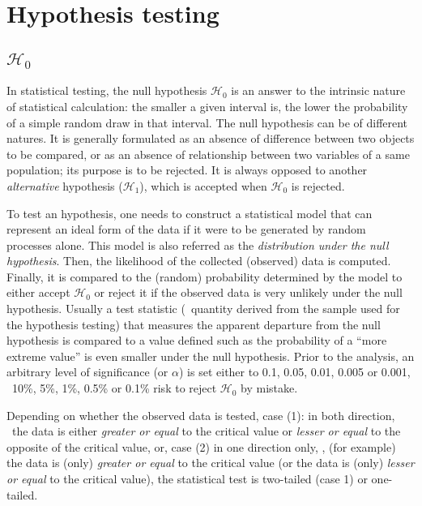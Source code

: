 \section{Hypothesis testing}\label{pq-values}

\subsection{$\mathcal{H}_0$}\label{H0}
In statistical testing,
the null hypothesis $\mathcal{H}_0$ is an answer
to the intrinsic nature of statistical calculation:
the smaller a given interval is,
the lower the probability of a simple random draw in that interval.
The null hypothesis can be of different natures.
It is generally formulated as an absence of difference
between two objects to be compared,
or as an absence of relationship between two variables of a same population;
its purpose is to be rejected.
It is always opposed to another \emph{alternative} hypothesis ($\mathcal{H}_1$),
which is accepted when $\mathcal{H}_0$ is rejected.

To test an hypothesis,
one needs to construct a statistical model that can represent an ideal form
of the data if it were to be generated by random processes alone.
This model is also referred as the \emph{distribution under the null hypothesis}.
Then, the likelihood of the collected (observed) data is computed.
Finally, it is compared to the (random) probability determined by the model
to either accept $\mathcal{H}_0$ or reject it
if the observed data is very unlikely under the null hypothesis.
Usually a test statistic
(\ie\ quantity derived from the sample used for the hypothesis testing)
that measures the apparent departure from the null hypothesis is compared
to a value defined such as the probability of a \enquote{more extreme value}
is even smaller under the null hypothesis.
Prior to the analysis, an arbitrary level of significance (or $\alpha$) is
set either to 0.1, 0.05, 0.01, 0.005 or 0.001,
\ie\ 10\%, 5\%, 1\%, 0.5\% or 0.1\% risk to reject $\mathcal{H}_0$ by mistake.

Depending on whether the observed data is tested, case (1): in both direction,
\ie\ the data is either \emph{greater or equal} to the critical value or
\emph{lesser or equal} to the opposite of the critical value,
or, case (2) in one direction only,
\ie, (for example) the data is (only) \emph{greater or equal} to the critical value
(or the data is (only) \emph{lesser or equal} to the critical value),
the statistical test is two-tailed (case 1) or one-tailed.

